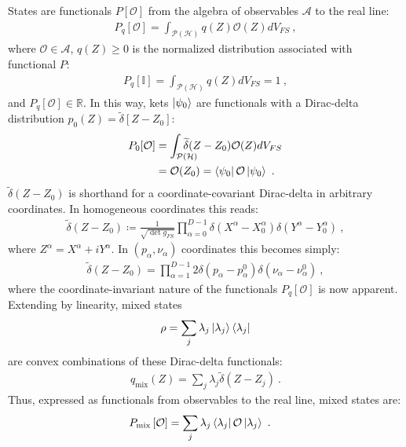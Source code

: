 \documentclass[draft,nofootinbib,pre,twocolumn,showpacs,showkeys,preprintnumbers,floatfix]{revtex4-1}
\newcommand{\1}{\mathbbm{1}}
\newcommand{\intP}{\int_{\mathcal{P}(\mathcal{H})} \!\!\!\!\!\!\!\!\!}
\begin{document}
States are functionals $P[\mathcal{O}]$ from the algebra of
observables $\mathcal{A}$ to the real line: 
\begin{align}
P_q[\mathcal{O}]
  = \int_{\mathcal{P}(\mathcal{H})} q(Z) \mathcal{O}(Z) dV_{FS}
  ~,
\label{eq:gqs}
\end{align}
where $\mathcal{O} \in \mathcal{A}$, $q(Z) \geq 0$ is the
normalized distribution associated with functional $P$:
\begin{align*}
P_q[\mathbb{I}] = \int_{\mathcal{P}(\mathcal{H})}
  q(Z) dV_{FS}  = 1
  ~,
\end{align*}
and $P_q[\mathcal{O}] \in \mathbb{R}$. 
In this way, kets $\ket{\psi_0}$ are functionals with a Dirac-delta
distribution $p_0(Z) = \widetilde{\delta}\left[ Z - Z_0\right]$:
\begin{align*}
P_{0}[\mathcal{O}] &= \intP \widetilde{\delta}(Z-Z_0)\mathcal{O}(Z) dV_{FS} \\
  & = \mathcal{O}(Z_0)  = \bra{\psi_0}\mathcal{O}\ket{\psi_0}
  ~.
\end{align*}
$\widetilde{\delta}(Z-Z_0)$ is shorthand for a coordinate-covariant Dirac-delta in
arbitrary coordinates. In homogeneous coordinates this reads:
\begin{align*}
\widetilde{\delta}(Z - Z_0) \coloneqq \frac{1}{\sqrt{\det g_{FS}}}
  \prod_{\alpha=0}^{D-1} \delta(X^\alpha - X^\alpha_0)
  \delta(Y^\alpha - Y^\alpha_0)
  ~,
\end{align*}
where $Z^\alpha = X^\alpha + iY^\alpha$. In $(p_\alpha,\nu_\alpha)$ coordinates
this becomes simply:
\begin{align*}
\widetilde{\delta}(Z - Z_0) = \prod_{\alpha=1}^{D-1} 2\delta(p_\alpha - p_\alpha^0) \delta(\nu_\alpha - \nu_\alpha^0)
  ~,
\end{align*}
where the coordinate-invariant nature of the functionals $P_q[\mathcal{O}]$ is
now apparent. Extending by linearity, mixed states
\begin{align*}
\rho = \sum_{j}\lambda_j \ket{\lambda_j}\bra{\lambda_j}
\end{align*}
are convex combinations of these Dirac-delta functionals:
\begin{align*}
q_{\mathrm{mix}}(Z) = \sum_{j}\lambda_j \widetilde{\delta}(Z-Z_j)
  ~. 
\end{align*}
Thus, expressed as functionals from observables to the real line, mixed states
are:
\begin{align}
P_{\mathrm{mix}}\left[ \mathcal{O}\right]
  & = \sum_{j} \lambda_j \bra{\lambda_j}\mathcal{O}\ket{\lambda_j}
  ~.
\label{eq:Functional}
\end{align}
\end{document}
